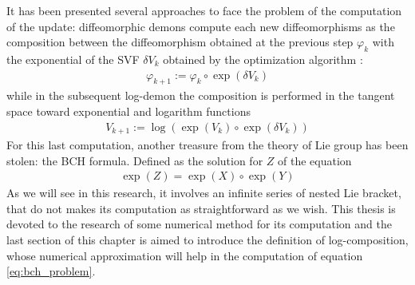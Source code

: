 It has been presented several approaches to face the problem of the computation of the update: diffeomorphic demons compute each new diffeomorphisms as the composition between the diffeomorphism obtained at the previous step $\varphi_{k}$ with the exponential of the SVF $\delta V_{k}$ obtained by the optimization algorithm :
\begin{align*}
\varphi_{k + 1} := \varphi_{k}  \circ \exp(\delta V_{k})
\end{align*}
while in the subsequent log-demon \cite{vercauteren08} the composition is performed in the tangent space toward exponential and logarithm functions
\begin{align}\label{eq:bch_problem}
V_{k + 1} := \log( \exp(V_{k})  \circ \exp(\delta V_{k}))
\end{align}
For this last computation, another treasure from the theory of Lie group has been stolen: the BCH formula. Defined as the solution for $Z$ of the equation 
\begin{align*}
 \exp(Z) = \exp(X)\circ\exp(Y)
\end{align*}
As we will see in this research, it involves an infinite series of nested Lie bracket, that do not makes its computation as straightforward as we wish. This thesis is devoted to the research of some numerical method for its computation and the last section of this chapter is aimed to introduce the definition of log-composition, whose numerical approximation will help in the computation of equation \ref{eq:bch_problem}.



